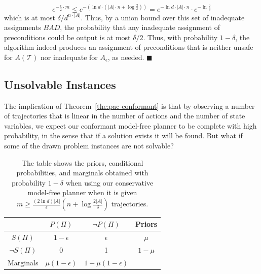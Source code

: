 \documentclass{article}
\newenvironment{proof}{\noindent{\bf Proof:~~}}{\qed}
\newcommand{\qed}{\hfill\ensuremath{\blacksquare}}
\newcommand{\solvable}{\textit{S}}
\newcommand{\plannable}{\textit{P}}
\begin{document}
\begin{proof}
		
		\begin{equation}
		e^{-\frac{\epsilon}{2} \cdot m}
		\leq 
		e^{-(\ln d \cdot (|A|\cdot n+\log\frac{2}{\delta}))}
		=e^{-\ln d \cdot |A|\cdot n}\cdot e^{-\ln  \frac{2}{\delta}}
		\end{equation}
		which is at most $\delta/d^{n\cdot |A|}$. Thus, by a union bound over this set of inadequate assignments $BAD$, the probability that any inadequate assignment of preconditions could be output is at most $\delta/2$.
		Thus, with probability $1-\delta$, the algorithm indeed produces an assignment of preconditions that is neither unsafe for $A(\mathcal{T})$ nor inadequate for $A_\epsilon$, as needed.
	\end{proof}
	
	\subsection{Unsolvable Instances}
	
	The implication of Theorem~\ref{the:pac-conformant} is that by observing 
	a number of trajectories that is linear in the number of actions and the number of state variables, 
	we expect our conformant model-free planner to be complete with high probability, in the sense that if a solution exists it will be found. But what if some of the drawn problem instances are not solvable? 

\begin{table}
	\centering
	\begin{tabular}{c|c|c|c}
			& $\plannable (\Pi)$ & $\neg\plannable(\Pi)$ & Priors \\ \hline
		$\solvable(\Pi)$ 		& $1-\epsilon$ & $\epsilon$ & $\mu$ \\
		$\neg\solvable(\Pi)$	& 0 & 1 & $1-\mu$ \\ \hline
		Marginals	& $\mu (1-\epsilon)$ & $1-\mu(1-\epsilon)$ &
	\end{tabular}
\caption{The table shows the priors, conditional probabilities, and marginals obtained with probability $1-\delta$ when using our conservative model-free planner when it is given $m\geq\frac{(2\ln  d)|A|}{\epsilon}(n+\log\frac{2|A|}{\delta})$ trajectories.}
\label{tab:probabilities}	
\end{table}
\end{document}
